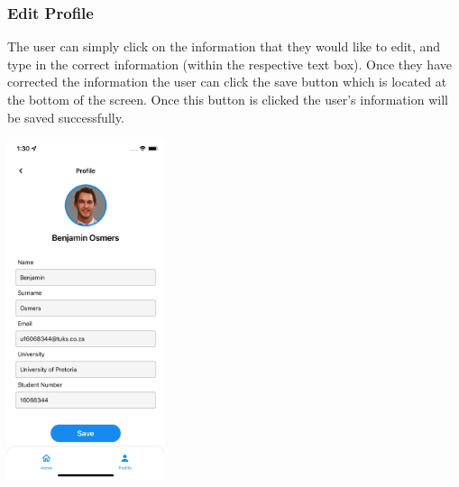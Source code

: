 \documentclass[hidelinks, 12pt, a4paper]{article}
\begin{document}
\subsubsection{Edit Profile}
The user can simply click on the information that they would like to edit, and type in the correct information (within the respective text box). Once they have corrected the information the user can click the save button which is located at the bottom of the screen. Once this button is clicked the user's information will be saved successfully.
\begin{center}
  \includegraphics[height=10cm]{images/edit_profile.png}
\end{center}
\end{document}
